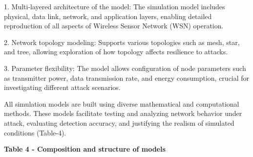 1. Multi-layered architecture of the model: The simulation model
includes physical, data link, network, and application layers, enabling
detailed reproduction of all aspects of Wireless Sensor Network (WSN)
operation.

2. Network topology modeling: Supports various topologies such as mesh,
star, and tree, allowing exploration of how topology affects resilience
to attacks.

3. Parameter flexibility: The model allows configuration of node
parameters such as transmitter power, data transmission rate, and energy
consumption, crucial for investigating different attack scenarios.

All simulation models are built using diverse mathematical and
computational methods. These models facilitate testing and analyzing
network behavior under attack, evaluating detection accuracy, and
justifying the realism of simulated conditions (Table-4).

{\bfseries Table 4 - Composition and structure of models}

